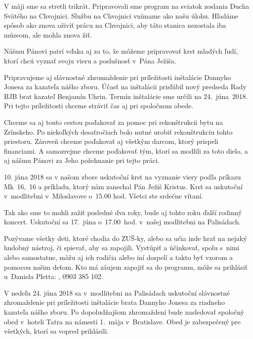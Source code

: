 V máji sme sa stretli trikrát. Pripravovali sme program na sviatok zoslania Ducha Svätého na Chvojnici. Službu na Chvojnici vnímame ako našu úlohu. Hľadáme spôsob ako znova oživiť prácu na Chvojnici, aby táto stanica nezostala iba múzeom, ale mohla znova žiť.

Nášmu Pánovi patrí vďaka aj za to, že môžeme pripravovať krst mladých ľudí, ktorí chcú vyznať svoju vieru a poslušnosť v~Pána Ježiša.

Pripravujeme aj slávnostné zhromaždenie pri príležitosti inštalácie Dannyho Jonesa za kazateľa nášho zboru. Účasť na inštalácii prisľúbil nový predseda Rady BJB brat kazateľ Benjamín Uhrin. Termín inštalácie sme určili na 24.~júna~2018. Pri tejto príležitosti chceme stráviť čas aj pri spoločnom obede.

Chceme sa aj touto cestou poďakovať za pomoc pri rekonštrukcii bytu na Zrínskeho. Po niekoľkých desaťročiach bolo nutné urobiť rekonštrukciu tohto priestoru. Zároveň chceme poďakovať aj všetkým darcom, ktorý prispeli financiami. A samozrejme chceme poďakovať tým, ktorí sa modlili za toto dielo, a aj nášmu Pánovi za Jeho požehnanie pri tejto práci.



10. júna 2018 sa v našom zbore uskutoční krst na vyznanie viery podľa príkazu Mk~16,~16 a príkladu, ktorý nám zanechal Pán Ježiš Kristus. Krst sa uskutoční v~modlitebni v~Miloslavove o~15.00 hod. Všetci ste srdečne vítaní.


Tak ako sme to mohli zažiť posledné dva roky, bude aj tohto roku ďalší rodinný koncert. Uskutoční sa 17.~júna o~17.00~hod. v~našej modlitebni na Palisádach.

Pozývame všetky deti, ktoré chodia do ZUŠ-ky, alebo sa učia inde hrať na nejaký hudobný nástroj, či spievať, aby sa zapojili. Vystúpiť a účinkovať, spolu s~nimi alebo samostatne, môžu aj ich rodičia alebo iní dospelí a takto byť vzorom a pomocou našim deťom. Kto má záujem zapojiť sa do programu, môže sa prihlásiť u~Daniela Pletta: , 0903 385 102.


V nedeľu 24. júna 2018 sa v~modlitebni na Palisádach uskutoční slávnostné zhromaždenie pri príležitosti inštalácie brata Dannyho Jonesa za riadneho kazateľa nášho zboru. Po dopoludňajšom zhromaždení bude nasledovať spoločný obed v~hoteli Tatra na námestí 1.~mája v~Bratislave. Obed je zabezpečený pre všetkých, ktorí sa vopred prihlásili.


